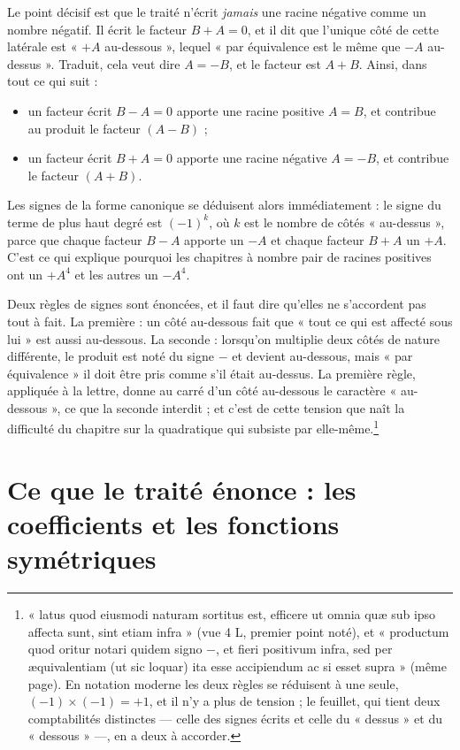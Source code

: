 \documentclass[11pt,a4paper]{article}
\begin{document}
Le point décisif est que le traité n'écrit \emph{jamais} une racine négative
comme un nombre négatif. Il écrit le facteur $B + A = 0$, et il dit que l'unique
côté de cette latérale est « $+A$ au-dessous », lequel « par équivalence est le
même que $-A$ au-dessus ». Traduit, cela veut dire $A = -B$, et le facteur est
$A + B$. Ainsi, dans tout ce qui suit :
\begin{itemize}
  \item un facteur écrit $B - A = 0$ apporte une racine positive $A = B$, et
    contribue au produit le facteur $(A - B)$ ;
  \item un facteur écrit $B + A = 0$ apporte une racine négative $A = -B$, et
    contribue le facteur $(A + B)$.
\end{itemize}
Les signes de la forme canonique se déduisent alors immédiatement : le signe du
terme de plus haut degré est $(-1)^k$, où $k$ est le nombre de côtés
« au-dessus », parce que chaque facteur $B - A$ apporte un $-A$ et chaque
facteur $B + A$ un $+A$. C'est ce qui explique pourquoi les chapitres à nombre
pair de racines positives ont un $+A^4$ et les autres un $-A^4$.

Deux règles de signes sont énoncées, et il faut dire qu'elles ne s'accordent pas
tout à fait. La première : un côté au-dessous fait que « tout ce qui est affecté
sous lui » est aussi au-dessous. La seconde : lorsqu'on multiplie deux côtés de
nature différente, le produit est noté du signe $-$ et devient au-dessous, mais
« par équivalence » il doit être pris comme s'il était au-dessus. La première
règle, appliquée à la lettre, donne au carré d'un côté au-dessous le caractère
« au-dessous », ce que la seconde interdit ; et c'est de cette tension que naît
la difficulté du chapitre sur la quadratique qui subsiste par
elle-même.\footnote{« latus quod eiusmodi naturam sortitus est, efficere ut omnia
quæ sub ipso affecta sunt, sint etiam infra » (vue 4 L, premier point noté), et
« productum quod oritur notari quidem signo $-$, et fieri positivum infra, sed
per æquivalentiam (ut sic loquar) ita esse accipiendum ac si esset supra »
(même page). En notation moderne les deux règles se réduisent à une seule,
$(-1)\times(-1) = +1$, et il n'y a plus de tension ; le feuillet, qui tient deux
comptabilités distinctes — celle des signes écrits et celle du « dessus » et du
« dessous » —, en a deux à accorder.}

\section*{Ce que le traité énonce : les coefficients et les fonctions symétriques}
\end{document}
